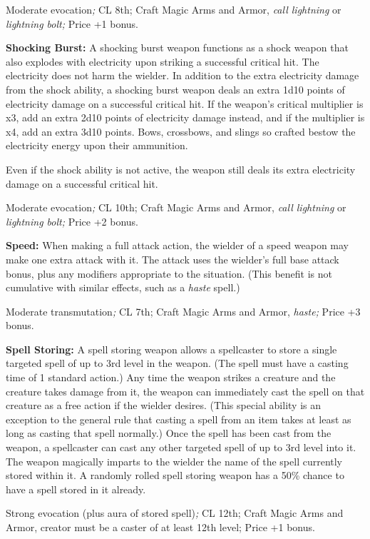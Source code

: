 \documentclass{article}
\begin{document}
Moderate evocation\textit{; }CL 8th; Craft Magic Arms and Armor, \textit{call lightning 
}or \textit{lightning bolt; }Price +1 bonus.

\textbf{Shocking Burst:} A shocking burst weapon functions as a shock weapon that 
also explodes with electricity upon striking a successful critical hit. The electricity 
does not harm the wielder. In addition to the extra electricity damage from the 
shock ability, a shocking burst weapon deals an extra 1d10 points of electricity 
damage on a successful critical hit. If the weapon's critical multiplier is x3, 
add an extra 2d10 points of electricity damage instead, and if the multiplier is 
x4, add an extra 3d10 points. Bows, crossbows, and slings so crafted bestow the 
electricity energy upon their ammunition.

Even if the shock ability is not active, the weapon still deals its extra electricity 
damage on a successful critical hit.

Moderate evocation\textit{; }CL 10th; Craft Magic Arms and Armor, \textit{call 
lightning }or \textit{lightning bolt; }Price +2 bonus.

\textbf{Speed: }When making a full attack action, the wielder of a speed weapon 
may make one extra attack with it. The attack uses the wielder's full base attack 
bonus, plus any modifiers appropriate to the situation. (This benefit is not cumulative 
with similar effects, such as a \textit{haste }spell.)

Moderate transmutation\textit{; }CL 7th; Craft Magic Arms and Armor, \textit{haste; 
}Price +3 bonus.

\textbf{Spell Storing:} A spell storing weapon allows a spellcaster to store a 
single targeted spell of up to 3rd level in the weapon. (The spell must have a 
casting time of 1 standard action.) Any time the weapon strikes a creature and 
the creature takes damage from it, the weapon can immediately cast the spell on 
that creature as a free action if the wielder desires. (This special ability is 
an exception to the general rule that casting a spell from an item takes at least 
as long as casting that spell normally.) Once the spell has been cast from the 
weapon, a spellcaster can cast any other targeted spell of up to 3rd level into 
it. The weapon magically imparts to the wielder the name of the spell currently 
stored within it. A randomly rolled spell storing weapon has a 50\% chance to have 
a spell stored in it already.

Strong evocation (plus aura of stored spell)\textit{; }CL 12th; Craft Magic Arms 
and Armor, creator must be a caster of at least 12th level; Price +1 bonus.
\end{document}
